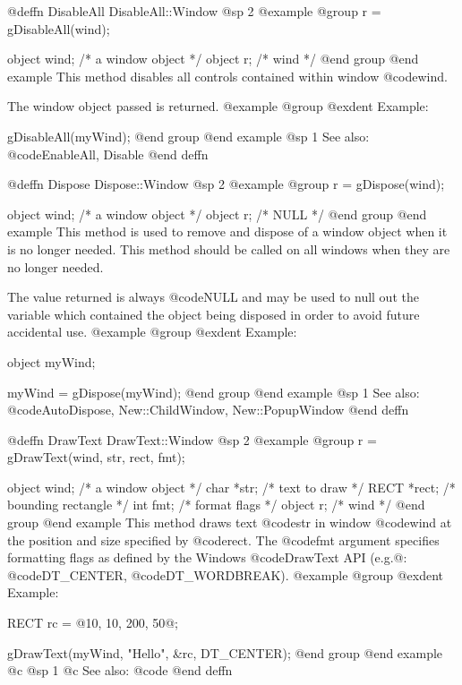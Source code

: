 @deffn {DisableAll} DisableAll::Window
@sp 2
@example
@group
r = gDisableAll(wind);

object  wind;   /*  a window object  */
object  r;      /*  wind             */
@end group
@end example
This method disables all controls contained within window
@code{wind}.

The window object passed is returned.
@example
@group
@exdent Example:

gDisableAll(myWind);
@end group
@end example
@sp 1
See also:  @code{EnableAll, Disable}
@end deffn




@deffn {Dispose} Dispose::Window
@sp 2
@example
@group
r = gDispose(wind);

object  wind;   /*  a window object    */
object  r;      /*  NULL               */
@end group
@end example
This method is used to remove and dispose of a window object when it
is no longer needed.  This method should be called on all windows
when they are no longer needed.

The value returned is always @code{NULL} and may be used to null out
the variable which contained the object being disposed in order to
avoid future accidental use.
@example
@group
@exdent Example:

object  myWind;

myWind = gDispose(myWind);
@end group
@end example
@sp 1
See also:  @code{AutoDispose, New::ChildWindow, New::PopupWindow}
@end deffn










@deffn {DrawText} DrawText::Window
@sp 2
@example
@group
r = gDrawText(wind, str, rect, fmt);

object  wind;   /*  a window object    */
char   *str;    /*  text to draw       */
RECT   *rect;   /*  bounding rectangle */
int     fmt;    /*  format flags       */
object  r;      /*  wind               */
@end group
@end example
This method draws text @code{str} in window @code{wind} at the
position and size specified by @code{rect}.  The @code{fmt}
argument specifies formatting flags as defined by the Windows
@code{DrawText} API (e.g.@: @code{DT_CENTER}, @code{DT_WORDBREAK}).
@example
@group
@exdent Example:

RECT  rc = @{10, 10, 200, 50@};

gDrawText(myWind, "Hello", &rc, DT_CENTER);
@end group
@end example
@c @sp 1
@c See also:  @code{}
@end deffn




